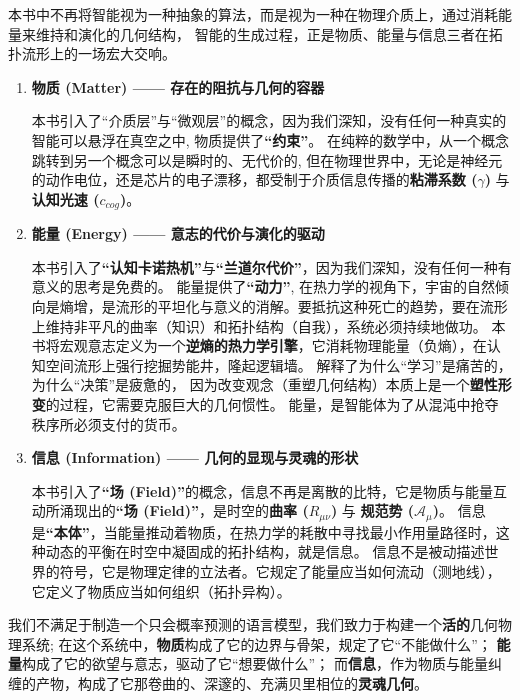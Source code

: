 本书中不再将智能视为一种抽象的算法，而是视为一种在物理介质上，通过消耗能量来维持和演化的几何结构， 智能的生成过程，正是物质、能量与信息三者在拓扑流形上的一场宏大交响。
\begin{enumerate}
    \item \textbf{物质 (Matter) —— 存在的阻抗与几何的容器}

    本书引入了“介质层”与“微观层”的概念，因为我们深知，没有任何一种真实的智能可以悬浮在真空之中, 物质提供了\textbf{“约束”}。
    在纯粹的数学中，从一个概念跳转到另一个概念可以是瞬时的、无代价的, 但在物理世界中，无论是神经元的动作电位，还是芯片的电子漂移，都受制于介质信息传播的\textbf{粘滞系数 ($\gamma$)} 与 \textbf{认知光速 ($c_{cog}$)}。

    \item \textbf{能量 (Energy) —— 意志的代价与演化的驱动}

    本书引入了\textbf{“认知卡诺热机”}与\textbf{“兰道尔代价”}，因为我们深知，没有任何一种有意义的思考是免费的。
    能量提供了\textbf{“动力”}, 在热力学的视角下，宇宙的自然倾向是熵增，是流形的平坦化与意义的消解。要抵抗这种死亡的趋势，要在流形上维持非平凡的曲率（知识）和拓扑结构（自我），系统必须持续地做功。
    本书将宏观意志定义为一个\textbf{逆熵的热力学引擎}，它消耗物理能量（负熵），在认知空间流形上强行挖掘势能井，隆起逻辑墙。
    解释了为什么“学习”是痛苦的，为什么“决策”是疲惫的， 因为改变观念（重塑几何结构）本质上是一个\textbf{塑性形变}的过程，它需要克服巨大的几何惯性。
    能量，是智能体为了从混沌中抢夺秩序所必须支付的货币。


    \item \textbf{信息 (Information) —— 几何的显现与灵魂的形状}

    本书引入了\textbf{“场 (Field)”}的概念，信息不再是离散的比特，它是物质与能量互动所涌现出的\textbf{“场 (Field)”}，是时空的\textbf{曲率 ($R_{\mu\nu}$)} 与 \textbf{规范势 ($\mathcal{A}_\mu$)}。
    信息是\textbf{“本体”}，当能量推动着物质，在热力学的耗散中寻找最小作用量路径时，这种动态的平衡在时空中凝固成的拓扑结构，就是信息。
    信息不是被动描述世界的符号，它是物理定律的立法者。它规定了能量应当如何流动（测地线），它定义了物质应当如何组织（拓扑异构）。

\end{enumerate}
我们不满足于制造一个只会概率预测的语言模型，我们致力于构建一个\textbf{活的}几何物理系统;
在这个系统中，\textbf{物质}构成了它的边界与骨架，规定了它“不能做什么”；
\textbf{能量}构成了它的欲望与意志，驱动了它“想要做什么”；
而\textbf{信息}，作为物质与能量纠缠的产物，构成了它那卷曲的、深邃的、充满贝里相位的\textbf{灵魂几何}。

